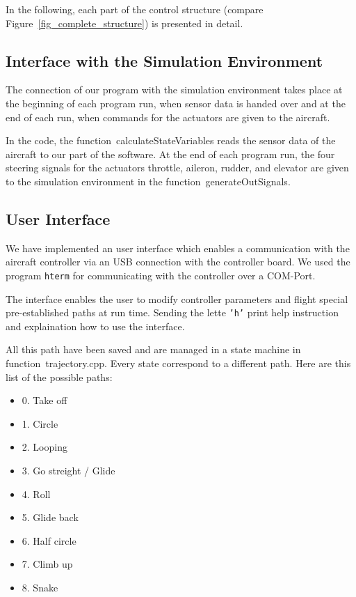 \documentclass[11pt,a4paper]{scrartcl}		%
\begin{document}
In the following, each part of the control structure (compare Figure~\ref{fig_complete_structure}) is presented in detail.

\medskip





\subsection{Interface with the Simulation Environment}

The connection of our program with the simulation environment takes place at the beginning of each program run, when sensor data is handed over and at the end of each run, when commands for the actuators are given to the aircraft.

In the code, the function~\textsf{calculateStateVariables} reads the sensor data of the aircraft to our part of the software.
At the end of each program run, the four steering signals for the actuators throttle, aileron, rudder, and elevator are given to the simulation environment in the function~\textsf{generateOutSignals}.

\medskip




\subsection{User Interface}

We have implemented an user interface which enables a communication with the aircraft controller via an USB connection with the controller board. 
We used the program \texttt{hterm} for communicating with the controller over a COM-Port.

The interface enables the user to modify controller parameters and flight special pre-established paths at run time. Sending the lette \texttt{'h'} print help instruction and explaination how to use the interface.

All this path have been saved and are managed in a state machine in function~\textsf{trajectory.cpp}. Every state correspond to a different path. Here are this list of the possible paths:

\begin{itemize}
\item 
0.	Take off
\item
1.	Circle
\item
2.	Looping
\item
3.	Go streight / Glide
\item
4.	Roll		
\item	
5.	Glide back
\item
6.	Half circle
\item
7.	Climb up
\item
8.	Snake
\end{itemize}
\end{document}
